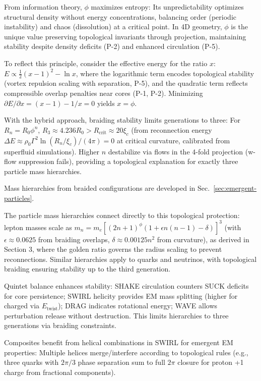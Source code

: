 From information theory, $\phi$ maximizes entropy: Its unpredictability optimizes structural density without energy concentrations, balancing order (periodic instability) and chaos (dissolution) at a critical point. In 4D geometry, $\phi$ is the unique value preserving topological invariants through projection, maintaining stability despite density deficits (P-2) and enhanced circulation (P-5).

To reflect this principle, consider the effective energy for the ratio $x$: $E \propto \frac{1}{2} (x - 1)^2 - \ln x$, where the logarithmic term encodes topological stability (vortex repulsion scaling with separation, P-5), and the quadratic term reflects compressible overlap penalties near cores (P-1, P-2). Minimizing $\partial E / \partial x = (x - 1) - 1/x = 0$ yields $x = \phi$.

With the hybrid approach, braiding stability limits generations to three: For $R_n = R_0 \phi^n$, $R_3 \approx 4.236 R_0 > R_{\text{crit}} \approx 20 \xi_c$ (from reconnection energy $\Delta E \approx \rho_0 \Gamma^2 \ln(R_n / \xi_c) / (4\pi) = 0$ at critical curvature, calibrated from superfluid simulations). Higher $n$ destabilize via flows in the 4-fold projection (w-flow suppression fails), providing a topological explanation for exactly three particle mass hierarchies.

Mass hierarchies from braided configurations are developed in Sec.~\ref{sec:emergent-particles}.

The particle mass hierarchies connect directly to this topological protection: lepton masses scale as $m_n = m_e [(2n+1)^\phi (1 + \epsilon n(n-1) - \delta)]^3$ (with $\epsilon \approx 0.0625$ from braiding overlaps, $\delta \approx 0.00125 n^2$ from curvature), as derived in Section 3, where the golden ratio governs the radius scaling to prevent reconnections. Similar hierarchies apply to quarks and neutrinos, with topological braiding ensuring stability up to the third generation.

Quintet balance enhances stability: SHAKE circulation counters SUCK deficits for core persistence; SWIRL helicity provides EM mass splitting (higher for charged via $E_{\text{twist}}$); DRAG indicates rotational energy; WAVE allows perturbation release without destruction. This limits hierarchies to three generations via braiding constraints.

Composites benefit from helical combinations in SWIRL for emergent EM properties: Multiple helices merge/interfere according to topological rules (e.g., three quarks with $2\pi/3$ phase separation sum to full $2\pi$ closure for proton +1 charge from fractional components).

